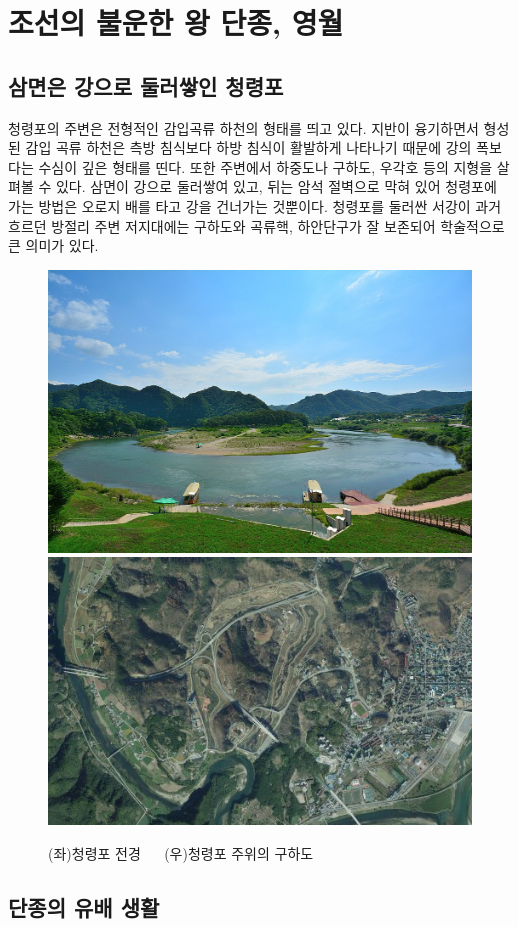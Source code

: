 \section{조선의 불운한 왕 단종, 영월}
\subsection{삼면은 강으로 둘러쌓인 청령포}
청령포의 주변은 전형적인 감입곡류 하천의 형태를 띄고 있다. 
지반이 융기하면서 형성된 감입 곡류 하천은 측방 침식보다 하방 침식이 활발하게 나타나기 때문에 강의 폭보다는 수심이 깊은 형태를 띤다. 
또한 주변에서 하중도나 구하도, 우각호 등의 지형을 살펴볼 수 있다. 삼면이 강으로 둘러쌓여 있고, 
뒤는 암석 절벽으로 막혀 있어 청령포에 가는 방법은 오로지 배를 타고 강을 건너가는 것뿐이다. 
청령포를 둘러싼 서강이 과거 흐르던 방절리 주변 저지대에는 구하도와 곡류핵, 하안단구가 잘 보존되어 학술적으로 큰 의미가 있다.


\begin{figure}[ht]
    \centering
    \includegraphics[width=.4\textwidth]{s_img/청령포_사진.jpeg}
    \includegraphics[width=.4\textwidth]{s_img/청령포_구하도.png}
    \caption{(좌)청령포 전경 $\quad$ (우)청령포 주위의 구하도\protect\footnotemark}
    \label{fig:my_label_s3}
 \end{figure}

 
\subsection{단종의 유배 생활}

